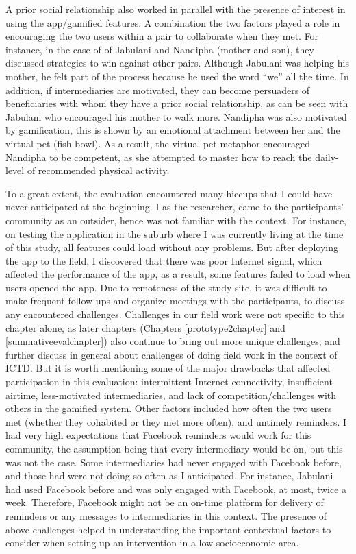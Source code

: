 A prior social relationship also worked in parallel with the presence of interest in using the app/gamified features. A combination the two factors played a role in  encouraging the two users within a pair to collaborate when they met. For instance, in the case of of Jabulani and Nandipha (mother and son), they discussed strategies to win against other pairs. Although Jabulani was helping his mother, he felt part of the process because he used the word ``we'' all the time. In addition, if intermediaries are motivated, they can become persuaders of beneficiaries with whom they have a prior social relationship, as can be seen with Jabulani who encouraged his mother to walk more. Nandipha was also motivated by gamification, this is shown by an emotional attachment between her and the virtual pet (fish bowl). As a result, the virtual-pet metaphor encouraged Nandipha to be competent, as she attempted to master how to reach the daily-level of recommended physical activity.

To a great extent, the evaluation encountered many hiccups that I could have never anticipated at the beginning. I as the researcher, came to the participants' community as an outsider, hence was not familiar with the context. For instance, on testing the application in the suburb where I was currently living at the time of this study, all features could load without any problems. But after deploying the app to the field, I discovered that there was poor Internet signal, which affected the performance of the app, as a result, some features failed to load when users opened the app. Due to remoteness of the study site, it was difficult to make frequent follow ups and organize meetings with the participants, to discuss any encountered challenges. Challenges in our field work were not specific to this chapter alone, as later chapters (Chapters \ref{prototype2chapter} and \ref{summativeevalchapter}) also continue to bring out more unique challenges; and further discuss in general about challenges of doing field work in the context of ICTD. But it is worth mentioning some of the major drawbacks that affected participation in this evaluation: intermittent Internet connectivity, insufficient airtime, less-motivated intermediaries, and lack of competition/challenges with others in the gamified system. Other factors included how often the two users met (whether they cohabited or they met more often), and untimely reminders. I had very high expectations that Facebook reminders would work for this community, the assumption being that every intermediary would be on, but this was not the case. Some intermediaries had never engaged with Facebook before, and those had were not doing so often as I anticipated. For instance, Jabulani had used Facebook before and was only engaged with Facebook, at most, twice a week. Therefore, Facebook might not be an on-time platform for delivery of reminders or any messages to intermediaries in this context. The presence of above challenges helped in understanding the important contextual factors to consider when setting up an intervention in a low socioeconomic area. 

